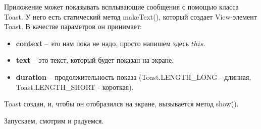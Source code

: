 

Приложение может показывать всплывающие сообщения с помощью класса Toast. У него есть статический метод makeText(), который создает View-элемент Toast. В качестве параметров он принимает:

\begin{itemize}

\item{\bf context} -- это нам пока не надо, просто напишем здесь $this$.

\item{\bf text} -- это текст, который будет показан на экране.

\item{\bf duration} -- продолжительность показа (Toast.LENGTH\_LONG - длинная, Toast.LENGTH\_SHORT - короткая).

\end{itemize}

Toast создан, и, чтобы он отобразился на экране, вызывается метод show(). 


Запускаем, смотрим и радуемся.



